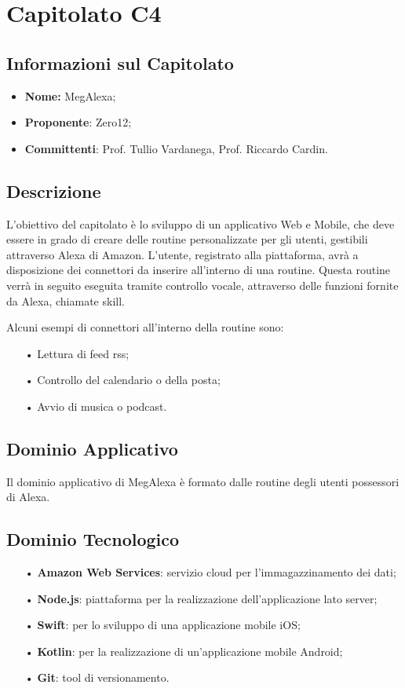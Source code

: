 \section{Capitolato C4}
\subsection{Informazioni sul Capitolato}
\begin{itemize}
	\item \textbf{Nome:} MegAlexa;
	\item \textbf{Proponente}: Zero12;
	\item \textbf{Committenti}: Prof. Tullio Vardanega, Prof. Riccardo Cardin.
\end{itemize}

\subsection{Descrizione}
L'obiettivo del capitolato è lo sviluppo di un applicativo Web e Mobile, che deve essere in grado di creare delle routine personalizzate per gli utenti, gestibili attraverso Alexa di Amazon.
L'utente, registrato alla piattaforma, avrà a disposizione dei {connettori} da inserire all'interno di una routine. Questa routine verrà in seguito eseguita tramite controllo vocale, attraverso delle funzioni fornite da Alexa, chiamate {skill}.

Alcuni esempi di connettori all'interno della routine sono:
\begin{itemize}
\item[•] Lettura di feed {rss};
\item[•] Controllo del calendario o della posta;
\item[•] Avvio di musica o podcast.
\end{itemize}

\subsection{Dominio Applicativo}
Il dominio applicativo di MegAlexa è formato dalle routine degli utenti possessori di Alexa.

\subsection{Dominio Tecnologico}
\begin{itemize}

\item[•] \textbf{Amazon Web Services}: servizio cloud per l'immagazzinamento dei dati; 
\item[•] \textbf{Node.js}: piattaforma per la realizzazione dell'applicazione lato server;
\item[•] \textbf{Swift}: per lo sviluppo di una applicazione mobile iOS;
\item[•] \textbf{Kotlin}: per la realizzazione di un'applicazione mobile Android;
\item[•] \textbf{Git}: tool di versionamento.

\end{itemize}

